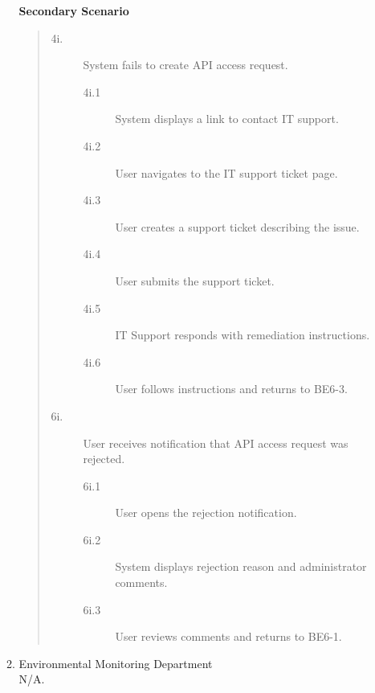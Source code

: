 \documentclass[]{article}
\begin{document}
\begin{enumerate}[{\bf BE7.}]
\begin{enumerate}[{\bf VP1.}]
                \textbf{Secondary Scenario}
                \begin{quote}
                    \begin{description}
                        \item[\textmd{4i.}] System fails to create API access request.
                        \begin{description}
                            \item[\textmd{4i.1}] System displays a link to contact IT support.
                            \item[\textmd{4i.2}] User navigates to the IT support ticket page.
                            \item[\textmd{4i.3}] User creates a support ticket describing the issue.
                            \item[\textmd{4i.4}] User submits the support ticket.
                            \item[\textmd{4i.5}] IT Support responds with remediation instructions.
                            \item[\textmd{4i.6}] User follows instructions and returns to BE6-3.
                        \end{description}
                        \item[\textmd{6i.}] User receives notification that API access request was rejected.
                        \begin{description}
                            \item[\textmd{6i.1}] User opens the rejection notification.
                            \item[\textmd{6i.2}] System displays rejection reason and administrator comments.
                            \item[\textmd{6i.3}] User reviews comments and returns to BE6-1.
                        \end{description}
                    \end{description}
                \end{quote}

            \item Environmental Monitoring Department \\
                N/A.


\end{enumerate}
\end{enumerate}
\end{document}
